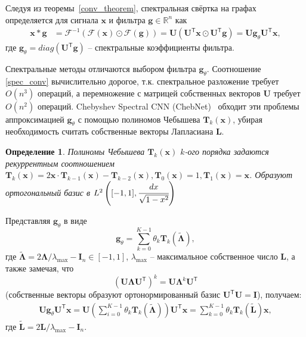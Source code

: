 \documentclass[14pt]{extarticle}
\newtheorem{Def}{Определение}
\begin{document}
Следуя из теоремы~\ref{conv_theorem}, спектральная свёртка на графах определяется для сигнала $\mathbf{x}$ и фильтра $\mathbf{g} \in \mathbb{R}^{n}$ как 
\begin{align}
\mathbf{x} * \mathbf{g} &=\mathscr{F}^{-1}(\mathscr{F}(\mathbf{x}) \odot \mathscr{F}(\mathbf{g})) =\mathbf{U}\left(\mathbf{U}^{\mathsf{T}} \mathbf{x} \odot \mathbf{U}^{\mathsf{T}} \mathbf{g}\right) = \mathbf{U g}_{\theta} \mathbf{U}^{\mathsf{T}} \mathbf{x},\label{spec_conv}
\end{align}
где $\mathbf{g}_{\theta} = diag\left(\mathbf{U}^{\mathsf{T}} \mathbf{g}\right)$ -- спектральные коэффициенты фильтра.

Спектральные методы отличаются выбором фильтра $\mathbf{g}_{\theta}$. Соотношение \ref{spec_conv} вычислительно дорогое, т.к. спектральное разложение требует $O\left(n^{3}\right)$ операций, а перемножение с матрицей собственных векторов $\mathbf{U}$ требует $O\left(n^{2}\right)$ операций. Chebyshev Spectral CNN (ChebNet)~\cite{NIPS2016_6081} обходит эти проблемы аппроксимацией $\mathbf{g}_{\theta}$ с помощью полиномов Чебышева $\mathbf{T}_k\mathbf{(x)}$, убирая необходимость считать собственные векторы Лапласиана $\mathbf{L}$.

\begin{Def}
	\textit{Полиномы Чебышева} $\mathbf{T}_k\mathbf{(x)}$ $k$-ого порядка задаются рекуррентным соотношением  $ \mathbf{T}_{k}(\mathbf{x})=2 \mathbf{x} \cdot \mathbf{T}_{k-1}(\mathbf{x})-\mathbf{T}_{k-2}(\mathbf{x}), \mathbf{T}_{0}(\mathbf{x})=1, \mathbf{T}_{1}(\mathbf{x})=\mathbf{x}$. Образуют ортогональный базис в $L^{2}\left([-1,1], \cfrac{d x} {\sqrt{1-x^{2}}}\right)$
\end{Def}

Представляя $\mathbf{g}_{\theta}$ в виде 
\[\mathbf{g}_{\theta}=\sum_{k=0}^{K-1} \theta_{k} \mathbf{T}_{k}\mathbf{(\tilde{\Lambda})},	\]
где $\mathbf{\tilde{\Lambda}} = 2 \mathbf{\Lambda} / \lambda_{\max }-\mathbf{I}_{n} \in[-1,1]$, $\lambda_{\max }$ -- максимальное собственное число $\mathbf{L}$, а также замечая, что 
\[
\left(\mathbf{U} \mathbf{\Lambda} \mathbf{U}^{\mathsf{T}}\right)^{k}=\mathbf{U} \mathbf{\Lambda}^{k} \mathbf{U}^{\mathsf{T}}
\]
(собственные векторы образуют ортонормированный базис $\mathbf{U}^{\mathsf{T}}\mathbf{U}=\mathbf{I}$), получаем:
\begin{align}
\mathbf{U g}_{\theta} \mathbf{U}^{\mathsf{T}} \mathbf{x}=\mathbf{U}\left(\sum_{i=0}^{K-1} \theta_{k} \mathbf{T}_{k}(\tilde{\mathbf{\Lambda}})\right) \mathbf{U}^{\mathsf{T}} \mathbf{x} = \sum_{k=0}^{K-1} \theta_{k} \mathbf{T}_{k}(\tilde{\mathbf{L}}) \mathbf{x},
\label{cheb_appr}
\end{align}
где $\tilde{\mathbf{L}}=2 \mathbf{L} / \lambda_{\max }-\mathbf{I}_{n}$.
\end{document}

